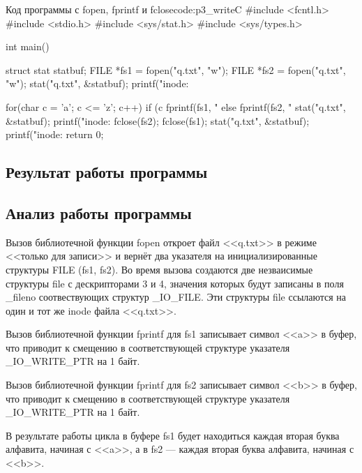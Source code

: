\begin{mylisting}{Код программы с fopen, fprintf и fclose}{code:p3_write}{C}
#include <fcntl.h>
#include <stdio.h>
#include <sys/stat.h>
#include <sys/types.h>

int main() 
{
	struct stat statbuf;
	FILE *fs1 = fopen("q.txt", "w");
	FILE *fs2 = fopen("q.txt", "w");
	stat("q.txt", &statbuf);
	printf("inode: %
	
	for(char c = 'a'; c <= 'z'; c++)
	{
		if (c%
		fprintf(fs1, "%
		else
		fprintf(fs2, "%
	}
	stat("q.txt", &statbuf);
	printf("inode: %
	fclose(fs2);
	fclose(fs1);
	stat("q.txt", &statbuf);
	printf("inode: %
	return 0;
}
\end{mylisting}

\subsection{Результат работы программы}


\subsection{Анализ работы программы}

Вызов библиотечной функции fopen откроет файл <<q.txt>> в режиме <<только для записи>> и вернёт два указателя на инициализированные структуры FILE (fs1, fs2). Во время вызова создаются две незваисимые структуры file с дескрипторами 3 и 4, значения которых будут записаны в поля \_fileno соотвествующих структур \_IO\_FILE. Эти структуры file ссылаются на один и тот же inode файла <<q.txt>>.

Вызов библиотечной функции fprintf для fs1 записывает символ <<a>> в буфер, что приводит к смещению в соответствующей структуре указателя \_IO\_WRITE\_PTR на 1 байт.

Вызов библиотечной функции fprintf для fs2 записывает символ <<b>> в буфер, что приводит к смещению в соответствующей структуре указателя \_IO\_WRITE\_PTR на 1 байт.

В результате работы цикла в буфере fs1 будет находиться каждая вторая буква алфавита, начиная с <<a>>, а в fs2 --- каждая вторая буква алфавита, начиная с <<b>>.

